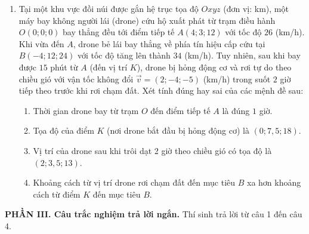 \documentclass[12pt]{article}
\begin{document}
\begin{enumerate}[label=\textbf{Câu \arabic*.}, leftmargin=*]
	\vspace{4mm}
	\item Tại một khu vực đồi núi được gắn hệ trục tọa độ $Oxyz$ (đơn vị: km), một máy bay không người lái (drone) cứu hộ xuất phát từ trạm điều hành $O(0; 0; 0)$ bay thẳng đều tới điểm tiếp tế $A(4; 3; 12)$ với tốc độ $26$ (km/h). Khi vừa đến $A$, drone bẻ lái bay thẳng về phía tín hiệu cấp cứu tại $B(-4; 12; 24)$ với tốc độ tăng lên thành $34$ (km/h). Tuy nhiên, sau khi bay được $15$ phút từ $A$ (đến vị trí $K$), drone bị hỏng động cơ và rơi tự do theo chiều gió với vận tốc không đổi $\vec{v} = (2; -4; -5)$ (km/h) trong suốt $2$ giờ tiếp theo trước khi rơi chạm đất. 
	Xét tính đúng hay sai của các mệnh đề sau:
	\begin{enumerate}[label=\alph*)]
		\item Thời gian drone bay từ trạm $O$ đến điểm tiếp tế $A$ là đúng $1$ giờ.
		\item Tọa độ của điểm $K$ (nơi drone bắt đầu bị hỏng động cơ) là $(0; 7,5; 18)$.
		\item Vị trí của drone sau khi trôi dạt 2 giờ theo chiều gió có tọa độ là $(2; 3,5; 13)$.
		\item Khoảng cách từ vị trí drone rơi chạm đất đến mục tiêu $B$ xa hơn khoảng cách từ điểm $K$ đến mục tiêu $B$.
	\end{enumerate}
		
	\end{enumerate} 
	
	\vspace{4mm}
	\noindent\textbf{PHẦN III. Câu trắc nghiệm trả lời ngắn.} Thí sinh trả lời từ câu 1 đến câu 4.
	\vspace{2mm}
	
\end{document}
